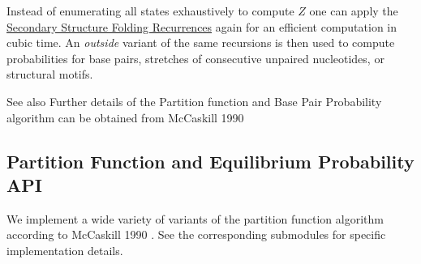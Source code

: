 Instead of enumerating all states exhaustively to compute $Z$ one can apply the \hyperlink{folding_grammar_sec_recursions}{Secondary Structure Folding Recurrences} again for an efficient computation in cubic time. An {\itshape outside} variant of the same recursions is then used to compute probabilities for base pairs, stretches of consecutive unpaired nucleotides, or structural motifs.

\begin{DoxySeeAlso}{See also}
Further details of the Partition function and Base Pair Probability algorithm can be obtained from Mc\+Caskill 1990 \cite{mccaskill:1990}
\end{DoxySeeAlso}
\hypertarget{pf_algorithm_sec_pf_api}{}\subsection{Partition Function and Equilibrium Probability A\+PI}\label{pf_algorithm_sec_pf_api}
We implement a wide variety of variants of the partition function algorithm according to Mc\+Caskill 1990 \cite{mccaskill:1990}. See the corresponding submodules for specific implementation details.

